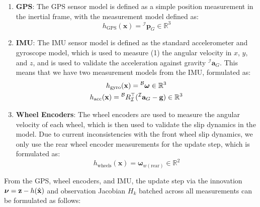 \begin{enumerate}
  \item \textbf{GPS}: The GPS sensor model is defined as a simple position measurement in the inertial frame, with the measurement model defined as:
    \begin{equation}
      h_\mathrm{GPS}(\mathbf{x}) = {}^\mathcal{I}\mathbf{p}_G \in \mathbb{R}^3
    \end{equation}
  \item \textbf{IMU}: The IMU sensor model is defined as the standard accelerometer and gyroscope model, which is used to measure (1) the angular velocity in $x$, $y$, and $z$, and is used to validate the acceleration against gravity ${}^\mathcal{I} \mathbf{a}_G$. This means that we have two measurement models from the IMU, formulated as:
    \begin{equation}
      \begin{gathered}
        h_\mathrm{gyro}(\mathbf{x}) = {}^\mathcal{B}\boldsymbol{\omega} \in \mathbb{R}^3\\
        h_\mathrm{acc}(\mathbf{x}) = {}^\mathcal{B}{R}_\mathcal{I}^\top ({}^\mathcal{I} \mathbf{a}_G - \mathbf{g}) \in \mathbb{R}^3
      \end{gathered}
    \end{equation}
  \item \textbf{Wheel Encoders}: The wheel encoders are used to measure the angular velocity of each wheel, which is then used to validate the slip dynamics in the model. Due to current inconsistencies with the front wheel slip dynamics, we only use the rear wheel encoder measurements for the update step, which is formulated as:
    \begin{equation}
      h_\mathrm{wheels}(\mathbf{x}) = \boldsymbol{\omega}_{w(\mathrm{rear})}\in \mathbb{R}^2
    \end{equation}
\end{enumerate}

From the GPS, wheel encoders, and IMU, the update step via the innovation $\boldsymbol{\nu}=\mathbf{z}-h(\hat{\mathbf{x}})$ and observation Jacobian $H_k$ batched across all measurements can be formulated as follows:

